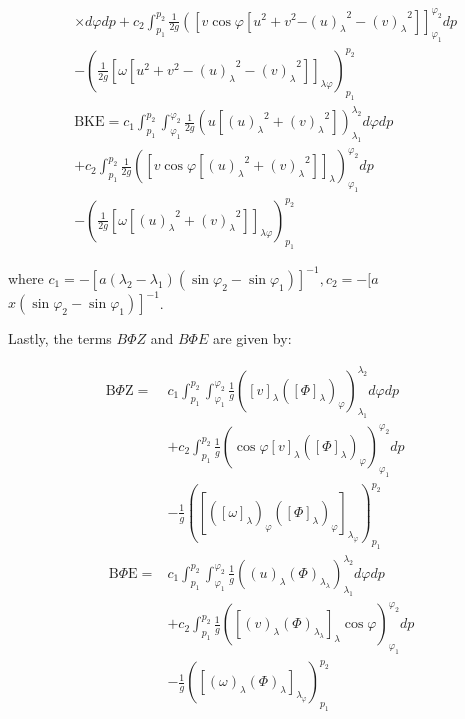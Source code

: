 \documentclass[pdflatex,sn-chicago]{sn-jnl}%
\theoremstyle{plain}
\theoremstyle{definition}
\theoremstyle{remark}
\theoremstyle{definition}
\begin{document}
\begin{align}
& \times d \varphi d p+c_2 \int_{p_1}^{p_2} \frac{1}{2 g}\left(\left[v \cos \varphi \left[u^2+v^2\right.\right.\right. \left.\left.-{(u)_\lambda}^2-{(v)_\lambda}^2\right]\right]_{\varphi_1}^{\varphi_2} d p  \\
& -\left(\frac{1}{2 g}\left[\omega\left[u^2+v^2-{(u)_\lambda}^2-{(v)_\lambda}^2\right]\right]_{\lambda \varphi}\right)_{p_1}^{p_2} \nonumber \\
& \mathrm{BKE}=c_1 \int_{p_1}^{p_2} \int_{\varphi_1}^{\varphi_2} \frac{1}{2 g}\left(u\left[{(u)_\lambda}^2+{(v)_\lambda}^2\right]\right)_{\lambda_1}^{\lambda_2} d \varphi d p \nonumber \\
& +c_2 \int_{p_1}^{p_2} \frac{1}{2 g}\left(\left[v \cos \varphi\left[{(u)_\lambda}^2+{(v)_\lambda}^2\right]\right]_\lambda\right)_{\varphi_1}^{\varphi_2} d p \\
& -\left(\frac{1}{2 g}\left[\omega\left[{(u)_\lambda}^2+{(v)_\lambda}^2\right]\right]_{\lambda \varphi}\right)_{p_1}^{p_2} \nonumber
\end{align}

where $c_1=-\left[a\left(\lambda_2-\lambda_1\right)\left(\sin \varphi_2-\sin \varphi_1\right)\right]^{-1}, c_2=-[a$ $\left.x\left(\sin \varphi_2-\sin \varphi_1\right)\right]^{-1}$.


Lastly, the terms $B\Phi Z$ and $B\Phi E$ are given by:

\begin{align}
\mathrm{B} \Phi \mathrm{Z}= & c_1 \int_{p_1}^{p_2} \int_{\varphi_1}^{\varphi_2} \frac{1}{g}\left([v]_\lambda\left([\Phi]_\lambda\right)_{\varphi}\right)_{\lambda_1}^{\lambda_2} d \varphi d p \nonumber \\
& +c_2 \int_{p_1}^{p_2} \frac{1}{g}\left(\cos \varphi[v]_\lambda\left([\Phi]_\lambda\right)_{\varphi}\right)_{\varphi_1}^{\varphi_2} d p  \\
& -\frac{1} {g}\left(\left[\left([\omega]_\lambda\right)_{\varphi}\left([\Phi]_\lambda\right)_{\varphi}\right]_{\lambda_{\varphi}}\right)_{p_1}^{p_2} \nonumber \\
\mathrm{~B} \Phi \mathrm{E}= & c_1 \int_{p_1}^{p_2} \int_{\varphi_1}^{\varphi_2} \frac{1}{g}\left((u)_\lambda(\Phi)_{\lambda_\lambda}\right)_{\lambda_1}^{\lambda_2} d \varphi d p \nonumber \\
& +c_2 \int_{p_1}^{p_2} \frac{1}{g}\left(\left[(v)_\lambda(\Phi)_{\lambda_\lambda}\right]_\lambda \cos \varphi\right)_{\varphi_1}^{\varphi_2} d p \\
& -\frac{1}{g}\left(\left[(\omega)_\lambda(\Phi)_\lambda\right]_{\lambda_{\varphi}}\right)_{p_1}^{p_2} \nonumber
\end{align}
\end{document}
